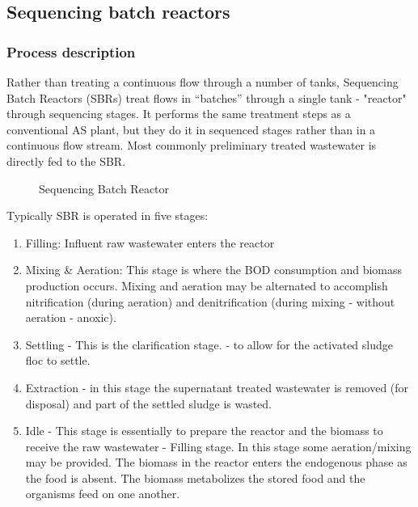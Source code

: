		\subsection{Sequencing batch reactors}



\subsubsection{Process description}
\noindent Rather than treating a continuous flow through a number of tanks, Sequencing Batch Reactors (SBRs) treat flows in “batches” through a single tank - "reactor" through sequencing stages.  It performs the same treatment steps as a conventional AS plant, but they do it in sequenced stages rather than in a continuous flow stream.  Most commonly preliminary treated wastewater is directly fed to the SBR.

\begin{figure}[h!]
\begin{center}
\caption{Sequencing Batch Reactor}
\end{center}
\end{figure}


Typically SBR is operated in five stages: 

\begin{enumerate}




\item Filling:  Influent raw wastewater enters the reactor 

\item Mixing \& Aeration:  This stage is where the BOD consumption and biomass production occurs.  Mixing and aeration may be alternated  to accomplish nitrification (during aeration) and denitrification (during mixing - without aeration - anoxic).

\item Settling - This is the clarification stage.  - to allow for the activated sludge floc to settle.

\item Extraction - in this stage the supernatant treated wastewater is removed (for disposal) and part of the settled sludge is wasted.

\item Idle - This stage is essentially to prepare the reactor and the biomass to receive the raw wastewater - Filling stage.  In this stage some aeration/mixing may be provided.  The biomass in the reactor enters the endogenous phase as the food is absent.  The biomass metabolizes the stored food and the organisms feed on one another.
\end{enumerate}


